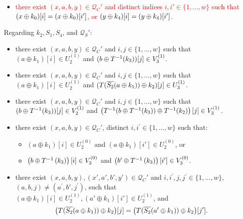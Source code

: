 \begin{definition}
\begin{itemize}[leftmargin=10mm]
	\item[\bfive] \textcolor{red}{there exist $(x,a,b,y) \in \mathcal{Q}_{C}'$ and distinct indices $i, i' \in \{1, \ldots, w\}$ such that $(x\oplus k_0)[i]=(x\oplus k_0)[i']$, or $(y\oplus k_4)[i]=(y\oplus k_4)[i']$.}
\end{itemize}
%
%
Regarding $k_2,S_1,S_4$, and $\mathcal{Q}_S'$:
%
%
\begin{itemize}[leftmargin=10mm]
	\item[\bfive]
	there exist $(x,a,b,y) \in \mathcal{Q}_{C}'$ and $i, j \in\{1, \ldots, w\}$ such that $(a \oplus k_1)[i]\in U_{2}^{(1)}$ and $(b\oplus T^{-1}(k_3))[j]\in V_{3}^{(1)}$.
	\item[\bsix]
	there exist $(x,a,b,y) \in \mathcal{Q}_{C}'$ and $i, j \in\{1, \ldots, w\}$ such that $(a \oplus k_1)[i]\in U_{2}^{(1)}$ and $(T(\overline{S_2}(a \oplus k_1))\oplus k_2)[j]\in U_{3}^{(1)}$.
	\item[\bseven]
	there exist $(x,a,b,y) \in \mathcal{Q}_{C}'$ and $i, j \in\{1, \ldots, w\}$ such that $(b\oplus T^{-1}(k_3))[j]\in V_{2}^{(1)}$ and $\left(T^{-1}(b\oplus T^{-1}(k_3)) \oplus T^{-1}(k_2)\right)[j]\in V_{3}^{(1)}$.
	\item[\beight]
	there exist $(x,a,b,y) \in \mathcal{Q}_{C}'$, distinct $i, i^{\prime}\in\{1, \ldots, w\}$ such that:
	\begin{itemize}
		\item $(a \oplus k_1)[i]\in U_{2}^{(0)}$ and $(a \oplus k_1)[i']\in U_{2}^{(0)}$, or
		\item $\left(b\oplus T^{-1}\left(k_3\right)\right)[i]\in V_3^{(0)}$ and
		$\left(b'\oplus T^{-1}\left(k_3\right)\right)[i']\in V_3^{(0)}$.
	\end{itemize}
	\item[\bnine] there exist $(x,a,b,y),(x',a',b',y') \in \mathcal{Q}_{C}'$ and $i, i^{\prime},j, j^{\prime} \in\{1, \ldots, w\}$, $(a,b, j) \neq \left(a^{\prime}, b',j^{\prime}\right)$, such that $(a \oplus k_1)[i]\in U_{2}^{(1)}, (a' \oplus k_1)[i']\in U_{2}^{(1)}$, and
	$$\big(T(\overline{S_2}(a\oplus k_1))\oplus k_2\big)[j]=\big(T(\overline{S_2}(a'\oplus k_1))\oplus k_2\big)[j'].
	$$

\end{itemize}
\end{definition}
